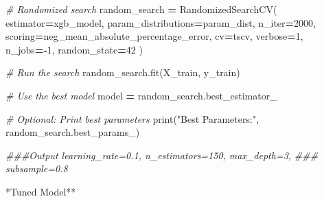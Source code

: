 \documentclass[mstat,12pt]{unswthesis}
\newenvironment{Shaded}{\begin{snugshade}}{\end{snugshade}}
\newcommand{\BuiltInTok}[1]{#1}
\newcommand{\CommentTok}[1]{\textcolor[rgb]{0.56,0.35,0.01}{\textit{#1}}}
\newcommand{\DecValTok}[1]{\textcolor[rgb]{0.00,0.00,0.81}{#1}}
\newcommand{\NormalTok}[1]{#1}
\newcommand{\OperatorTok}[1]{\textcolor[rgb]{0.81,0.36,0.00}{\textbf{#1}}}
\newcommand{\StringTok}[1]{\textcolor[rgb]{0.31,0.60,0.02}{#1}}
\begin{document}
\begin{Shaded}
\begin{Highlighting}[]
\CommentTok{\# Randomized search}
\NormalTok{random\_search }\OperatorTok{=}\NormalTok{ RandomizedSearchCV(}
\NormalTok{    estimator}\OperatorTok{=}\NormalTok{xgb\_model,}
\NormalTok{    param\_distributions}\OperatorTok{=}\NormalTok{param\_dist,}
\NormalTok{    n\_iter}\OperatorTok{=}\DecValTok{2000}\NormalTok{, }
\NormalTok{    scoring}\OperatorTok{=}\StringTok{\textquotesingle{}neg\_mean\_absolute\_percentage\_error\textquotesingle{}}\NormalTok{,}
\NormalTok{    cv}\OperatorTok{=}\NormalTok{tscv,}
\NormalTok{    verbose}\OperatorTok{=}\DecValTok{1}\NormalTok{,}
\NormalTok{    n\_jobs}\OperatorTok{={-}}\DecValTok{1}\NormalTok{,}
\NormalTok{    random\_state}\OperatorTok{=}\DecValTok{42}
\NormalTok{)}

\CommentTok{\# Run the search}
\NormalTok{random\_search.fit(X\_train, y\_train)}

\CommentTok{\# Use the best model}
\NormalTok{model }\OperatorTok{=}\NormalTok{ random\_search.best\_estimator\_}

\CommentTok{\# Optional: Print best parameters}
\BuiltInTok{print}\NormalTok{(}\StringTok{"Best Parameters:"}\NormalTok{, random\_search.best\_params\_)}

\CommentTok{\#\#\#Output learning\_rate=0.1, n\_estimators=150, max\_depth=3,}
\CommentTok{\#\#\# subsample=0.8}
\end{Highlighting}
\end{Shaded}

\noindent **Tuned Model**
\end{document}
